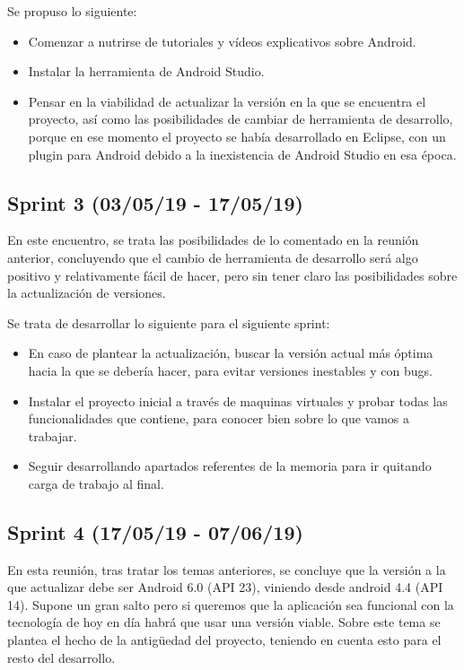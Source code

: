Se propuso lo siguiente:

\begin{itemize}
\item Comenzar a nutrirse de tutoriales y vídeos explicativos sobre Android.
\item Instalar la herramienta de Android Studio.
\item Pensar en la viabilidad de actualizar la versión en la que se encuentra el proyecto, así como las posibilidades de cambiar de herramienta de desarrollo, porque en ese momento el proyecto se había desarrollado en Eclipse, con un plugin para Android debido a la inexistencia de Android Studio en esa época.
\end{itemize}

\subsection{Sprint 3 (03/05/19 - 17/05/19)}

En este encuentro, se trata las posibilidades de lo comentado en la reunión anterior, concluyendo que el cambio de herramienta de desarrollo será algo positivo y relativamente fácil de hacer, pero sin tener claro las posibilidades sobre la actualización de versiones. 

Se trata de desarrollar lo siguiente para el siguiente sprint:

\begin{itemize}
\item En caso de plantear la actualización, buscar la versión actual más óptima hacia la que se debería hacer, para evitar versiones inestables y con bugs.
\item Instalar el proyecto inicial a través de maquinas virtuales y probar todas las funcionalidades que contiene, para conocer bien sobre lo que vamos a trabajar.
\item Seguir desarrollando apartados referentes de la memoria para ir quitando carga de trabajo al final.
\end{itemize}

\subsection{Sprint 4 (17/05/19 - 07/06/19)}

En esta reunión, tras tratar los temas anteriores, se concluye que la versión a la que actualizar debe ser Android 6.0 (API 23), viniendo desde android 4.4 (API 14). Supone un gran salto pero si queremos que la aplicación sea funcional con la tecnología de hoy en día habrá que usar una versión viable. Sobre este tema se plantea el hecho de la antigüedad del proyecto, teniendo en cuenta esto para el resto del desarrollo.

